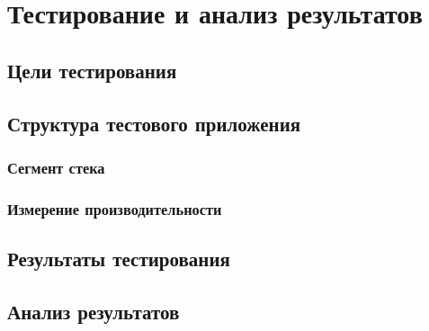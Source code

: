 \chapter{Тестирование и анализ результатов}

\section{Цели тестирования}

\section{Структура тестового приложения}

\subsection{Сегмент стека}

\subsection{Измерение производительности}

\section{Результаты тестирования}

\section{Анализ результатов}
